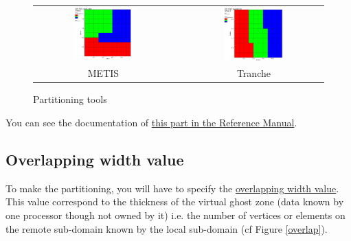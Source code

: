 \begin{figure}[h!]
\begin{centering}
\begin{tabular}{ccc}
\includegraphics[width=0.45\textwidth]{partition_metis.jpeg} & & \includegraphics[width=0.45\textwidth]{partition_tranche.jpeg}\tabularnewline
METIS & & Tranche\tabularnewline
\end{tabular}
\par\end{centering}
\caption{Partitioning tools}
\label{partitioning}
\end{figure}

You can see the documentation of \href{\REFERENCEMANUAL\#partition}{this part in the \trustref Reference Manual}.



\subsection{Overlapping width value}
To make the partitioning, you will have to specify the \underline{overlapping width value}.
This value correspond to the thickness of the virtual ghost zone (data known by one processor though not owned by it) i.e. the number of vertices or elements on the remote sub-domain known by the local sub-domain (cf Figure \ref{overlap}).

